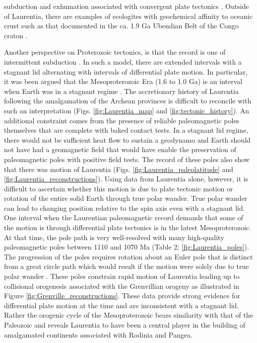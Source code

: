 \documentclass[11pt,letterpaper]{article}
\begin{document}
subduction and exhumation associated with convergent plate tectonics \citep{Weller2017a}. Outside of Laurentia, there are examples of ecologites with geochemical affinity to oceanic crust such as that documented in the ca. 1.9 Ga Ubendian Belt of the Congo craton \citep{Boniface2012a}.

Another perspective on Proterozoic tectonics, is that the record is one of intermittent subduction \citep{Silver2008a, ONeill2013a}. In such a model, there are extended intervals with a stagnant lid alternating with intervals of differential plate motion. In particular, it was been argued that the Mesoproterozoic Era (1.6 to 1.0 Ga) is an interval when Earth was in a stagnant regime \citep{Silver2008a, ONeill2013a}. The accretionary history of Laurentia following the amalgamation of the Archean provinces is difficult to reconcile with such an interpretation (Figs. \ref{fig:Laurentia_map} and \ref{fig:tectonic_history}). An additional constraint comes from the presence of reliable paleomagnetic poles themselves that are complete with baked contact tests. In a stagnant lid regime, there would not be sufficient heat flow to sustain a geodynamo and Earth should not have had a geomagnetic field that would have enable the preservation of paleomagnetic poles with positive field tests. The record of these poles also show that there was motion of Laurentia (Figs. \ref{fig:Laurentia_paleolatitude} and \ref{fig:Laurentia_reconstructions}). Using data from Laurentia alone, however, it is difficult to ascertain whether this motion is due to plate tectonic motion or rotation of the entire solid Earth through true polar wander. True polar wander can lead to changing position relative to the spin axis even with a stagnant lid. One interval when the Laurentian paleomagnetic record demands that some of the motion is through differential plate tectonics is in the latest Mesoproterozoic. At that time, the pole path is very well-resolved with many high-quality paleomagnetic poles between 1110 and 1070 Ma (Table 2; \ref{fig:Laurentia_poles}). The progression of the poles requires rotation about an Euler pole that is distinct from a great circle path which would result if the motion were solely due to true polar wander \citep{Swanson-Hysell2019a}. These poles constrain rapid motion of Laurentia leading up to collisional orogenesis associated with the Grenvillian orogeny as illustrated in Figure \ref{fig:Grenville_reconstructions}. These data provide strong evidence for differential plate motion at the time and are inconsistent with a stagnant lid. Rather the orogenic cycle of the Mesoproterozoic bears similarity with that of the Paleozoic and reveals Laurentia to have been a central player in the building of amalgamated continents associated with Rodinia and Pangea.
\end{document}
